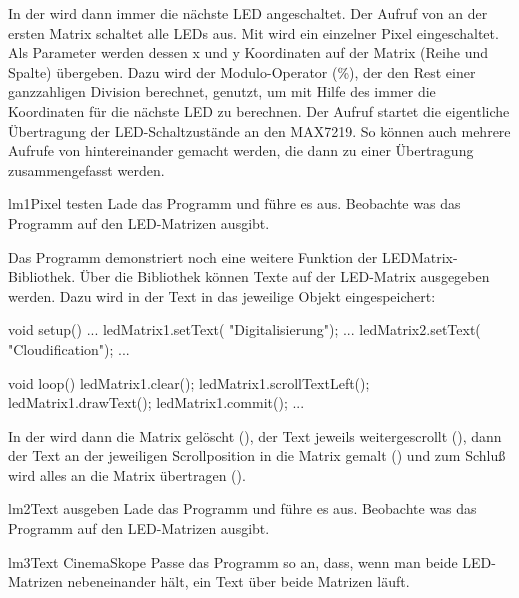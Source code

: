 \begin{multicols}{2}
In der  wird dann immer die nächste LED angeschaltet. Der Aufruf von  an der 
ersten Matrix schaltet alle LEDs aus. Mit  wird ein einzelner Pixel eingeschaltet. 
Als Parameter werden dessen x und y Koordinaten auf der Matrix (Reihe und Spalte) übergeben.
Dazu wird der Modulo-Operator (\%), der den Rest einer ganzzahligen Division berechnet, genutzt, um mit Hilfe
des  immer die Koordinaten für die nächste LED zu berechnen.
Der Aufruf  startet die eigentliche Übertragung der LED-Schaltzustände an den MAX7219.
So können auch mehrere Aufrufe von  hintereinander gemacht werden, die dann zu einer
Übertragung zusammengefasst werden.


\begin{excercise}{lm1}{Pixel testen}
Lade das Programm  und führe es aus.
Beobachte was das Programm auf den LED-Matrizen ausgibt.
\end{excercise}

Das Programm  demonstriert noch eine weitere Funktion der LEDMatrix-Bibliothek.
Über die Bibliothek können Texte auf der LED-Matrix ausgegeben werden. Dazu wird in 
der Text in das jeweilige Objekt eingespeichert:

\begin{src}
void setup() {
  ...
  ledMatrix1.setText(
    "Digitalisierung");
  ...
  ledMatrix2.setText(
    "Cloudification");
  ...
}
\end{src}
\vfill\null\columnbreak
\begin{src}
void loop() {
  ledMatrix1.clear();
  ledMatrix1.scrollTextLeft();
  ledMatrix1.drawText();
  ledMatrix1.commit();
  ...
}
\end{src}

In der  wird dann die Matrix gelöscht (), 
der Text jeweils weitergescrollt (),
dann der Text an der jeweiligen Scrollposition in die Matrix gemalt ()
und zum Schluß wird alles an die Matrix übertragen ().

\begin{excercise}{lm2}{Text ausgeben}
Lade das Programm  und führe es aus.
Beobachte was das Programm auf den LED-Matrizen ausgibt.
\end{excercise}

\begin{excercise}{lm3}{Text CinemaSkope}
Passe das Programm  so an, dass, wenn man beide LED-Matrizen nebeneinander hält, ein Text über beide
Matrizen läuft.
\end{excercise}


\end{multicols}
